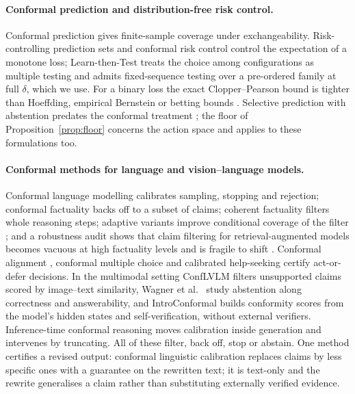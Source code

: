 \paragraph{Conformal prediction and distribution-free risk control.}
Conformal prediction \citep{vovk2005,papadopoulos2002,lei2018,angelopoulos2023gentle} gives
finite-sample coverage under exchangeability. Risk-controlling prediction sets \citep{bates2021rcps}
and conformal risk control \citep{angelopoulos2024crc} control the expectation of a monotone
loss; Learn-then-Test \citep{angelopoulos2021ltt} treats the choice among configurations as
multiple testing and admits fixed-sequence testing over a pre-ordered family at full $\delta$,
which we use. For a binary loss the exact Clopper--Pearson bound \citep{clopper1934} is tighter
than Hoeffding, empirical Bernstein or betting bounds \citep{waudbysmith2024}.
Selective prediction with abstention predates the conformal treatment
\citep{chow1970,elyaniv2010,bartlett2008,cortes2016,geifman2019}; the floor of
Proposition~\ref{prop:floor} concerns the action space and applies to these formulations too.

\paragraph{Conformal methods for language and vision--language models.}
Conformal language modelling \citep{conformallm} calibrates sampling, stopping and rejection;
conformal factuality \citep{conformalfactuality} backs off to a subset of claims;
coherent factuality \citep{rubintoles2025coherent} filters whole reasoning steps; adaptive
variants improve conditional coverage of the filter \citep{rubashevskii2026adaptive}; and a robustness
audit shows that claim filtering for retrieval-augmented models becomes vacuous at high
factuality levels and is fragile to shift \citep{chen2026ragconformal}. Conformal alignment
\citep{gui2024conformal}, conformal multiple choice \citep{kumar2023} and calibrated help-seeking
\citep{ren2023knowno} certify act-or-defer decisions. In the multimodal setting ConfLVLM
\citep{conflvlm} filters unsupported claims scored by image--text similarity, Wagner et al.\
\citep{twoaxes} study abstention along correctness and answerability, and IntroConformal
\citep{atabuzzaman2026introconformal} builds conformity scores from the model's hidden states and
self-verification, without external verifiers. Inference-time conformal reasoning
\citep{wang2026itcr} moves calibration inside generation and intervenes by truncating. All of
these filter, back off, stop or abstain. One method certifies a revised output:
conformal linguistic calibration \citep{jiang2025clc} replaces claims by less specific ones with a
guarantee on the rewritten text; it is text-only and the rewrite generalises a claim rather than
substituting externally verified evidence.

